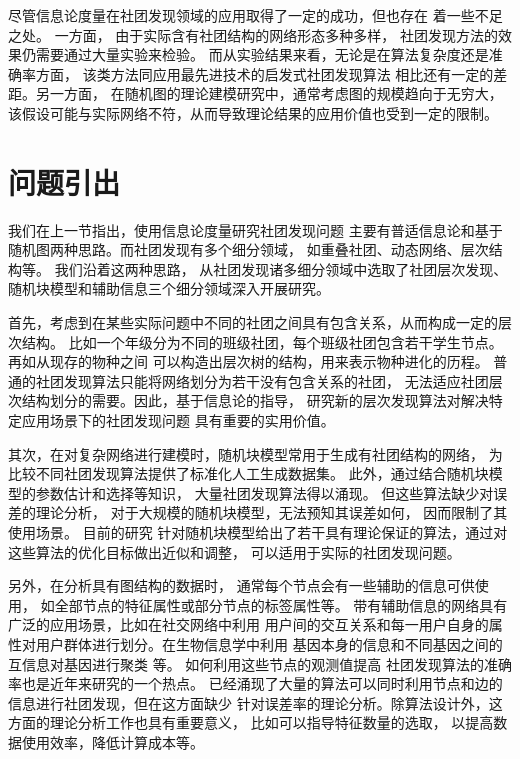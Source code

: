 尽管信息论度量在社团发现领域的应用取得了一定的成功，但也存在
着一些不足之处。
一方面，
由于实际含有社团结构的网络形态多种多样，
社团发现方法的效果仍需要通过大量实验来检验。
而从实验结果来看，无论是在算法复杂度还是准确率方面，
该类方法同应用最先进技术的启发式社团发现算法
相比还有一定的差距。另一方面，
在随机图的理论建模研究中，通常考虑图的规模趋向于无穷大，
该假设可能与实际网络不符，从而导致理论结果的应用价值也受到一定的限制。

\section{问题引出}
我们在上一节指出，使用信息论度量研究社团发现问题
主要有普适信息论和基于随机图两种思路。而社团发现有多个细分领域，
如重叠社团、动态网络、层次结构等。
我们沿着这两种思路，
从社团发现诸多细分领域中选取了社团层次发现、随机块模型和辅助信息三个细分领域深入开展研究。




首先，考虑到在某些实际问题中不同的社团之间具有包含关系，从而构成一定的层次结构。
比如一个年级分为不同的班级社团，每个班级社团包含若干学生节点。
再如从现存的物种之间
可以构造出层次树的结构，用来表示物种进化的历程。
普通的社团发现算法只能将网络划分为若干没有包含关系的社团，
无法适应社团层次结构划分的需要。因此，基于信息论的指导，
研究新的层次发现算法对解决特定应用场景下的社团发现问题
具有重要的实用价值。

其次，在对复杂网络进行建模时，随机块模型常用于生成有社团结构的网络，
为比较不同社团发现算法提供了标准化人工生成数据集。
此外，通过结合随机块模型的参数估计和选择等知识，
大量社团发现算法得以涌现。
但这些算法缺少对误差的理论分析，
对于大规模的随机块模型，无法预知其误差如何，
因而限制了其使用场景。
目前的研究
针对随机块模型给出了若干具有理论保证的算法，通过对这些算法的优化目标做出近似和调整，
可以适用于实际的社团发现问题。

另外，在分析具有图结构的数据时，
通常每个节点会有一些辅助的信息可供使用，
如全部节点的特征属性或部分节点的标签属性等。
带有辅助信息的网络具有广泛的应用场景，比如在社交网络中利用
用户间的交互关系和每一用户自身的属性对用户群体进行划分。在生物信息学中利用
基因本身的信息和不同基因之间的互信息对基因进行聚类 \cite{4359897}等。
如何利用这些节点的观测值提高
社团发现算法的准确率也是近年来研究的一个热点。
已经涌现了大量的算法可以同时利用节点和边的信息进行社团发现，但在这方面缺少
针对误差率的理论分析。除算法设计外，这方面的理论分析工作也具有重要意义，
比如可以指导特征数量的选取，
以提高数据使用效率，降低计算成本等。



